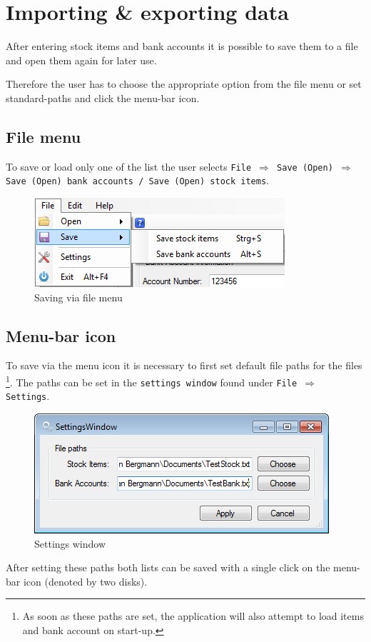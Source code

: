 \section{Importing \& exporting data}
\label{sec:import_export}

After entering stock items and bank accounts it is possible to save them to a file and open them again for later use.

Therefore the user has to choose the appropriate option from the file menu or set standard-paths and click the menu-bar icon.

\subsection{File menu}
\label{subsec:file_menu}

To save or load only one of the list the user selects \texttt{File $\Rightarrow$ Save (Open) $\Rightarrow$ Save (Open) bank accounts / Save (Open) stock items}.

\begin{figure}[H]
\begin{center}
\includegraphics[scale=0.8]{gfx/save_file_menu.png}
\caption{Saving via file menu}
\label{fig:save_file_menu}
\end{center}
\end{figure}

\subsection{Menu-bar icon}

To save via the menu icon it is necessary to first set default file paths for the files \footnote{As soon as these paths are set, the application will also attempt to load items and bank account on start-up.}. The paths can be set in the \texttt{settings window} found under \texttt{File $\Rightarrow$ Settings}.

\begin{figure}[H]
\begin{center}
\includegraphics[scale=0.8]{gfx/settings_window.png}
\caption{Settings window}
\label{fig:settings_window}
\end{center}
\end{figure}

After setting these paths both lists can be saved with a single click on the menu-bar icon (denoted by two disks).
